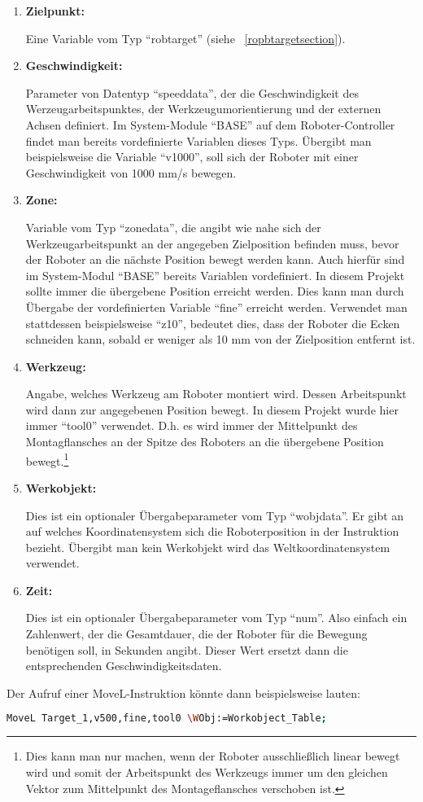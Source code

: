 \begin{enumerate}
\item \textbf{Zielpunkt:}

Eine Variable vom Typ \enquote{robtarget} (siehe ~\ref{ropbtargetsection}).
\item \textbf{Geschwindigkeit:}

Parameter von Datentyp \enquote{speeddata}, der die Geschwindigkeit des Werzeugarbeitspunktes, der Werkzeugumorientierung und der externen Achsen definiert. Im System-Module \enquote{BASE} auf dem Roboter-Controller findet man bereits vordefinierte Variablen dieses Typs. Übergibt man beispielsweise die Variable \enquote{v1000}, soll sich der Roboter mit einer Geschwindigkeit von 1000 mm/s bewegen. 
\item \textbf{Zone:}

Variable vom Typ \enquote{zonedata}, die angibt wie nahe sich der Werkzeugarbeitspunkt an der angegeben Zielposition befinden muss, bevor der Roboter an die nächste Position bewegt werden kann. Auch hierfür sind im System-Modul \enquote{BASE} bereits Variablen vordefiniert. In diesem Projekt sollte immer die übergebene Position erreicht werden. Dies kann man durch Übergabe der vordefinierten Variable \enquote{fine} erreicht werden. Verwendet man stattdessen beispielsweise \enquote{z10}, bedeutet dies, dass der Roboter die Ecken schneiden kann, sobald er weniger als 10 mm von der Zielposition entfernt ist.
\item \textbf{Werkzeug:}

Angabe, welches Werkzeug am Roboter montiert wird. Dessen Arbeitspunkt wird dann zur angegebenen Position bewegt. In diesem Projekt wurde hier immer \enquote{tool0} verwendet. D.h. es wird immer der Mittelpunkt des Montagflansches an der Spitze des Roboters an die übergebene Position bewegt.\footnote{Dies kann man nur machen, wenn der Roboter ausschließlich linear bewegt wird und somit der Arbeitspunkt des Werkzeugs immer um den gleichen Vektor zum Mittelpunkt des Montageflansches verschoben ist.}  
\item \textbf{Werkobjekt:}

Dies ist ein optionaler Übergabeparameter vom Typ \enquote{wobjdata}. Er gibt an auf welches Koordinatensystem sich die Roboterposition in der Instruktion bezieht. Übergibt man kein Werkobjekt wird das Weltkoordinatensystem verwendet. 
\item \textbf{Zeit:}

Dies ist ein optionaler Übergabeparameter vom Typ \enquote{num}. Also einfach ein Zahlenwert, der die Gesamtdauer, die der Roboter für die Bewegung benötigen soll,  in Sekunden angibt. Dieser Wert ersetzt dann die entsprechenden Geschwindigkeitsdaten.
\end{enumerate}

Der Aufruf einer MoveL-Instruktion könnte dann beispielsweise lauten:

\begin{lstlisting}[caption=Beispielaufruf der MoveL-Instruktion, label=movel, language=bash]
MoveL Target_1,v500,fine,tool0 \WObj:=Workobject_Table;
\end{lstlisting}